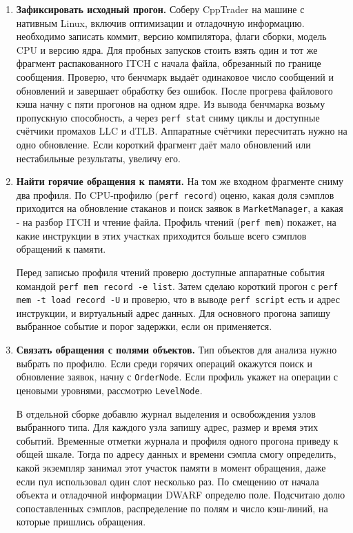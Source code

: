 \documentclass[a4paper,12pt]{article}
\begin{document}
\begin{enumerate}
    \item \textbf{Зафиксировать исходный прогон.}
    Соберу CppTrader на машине с нативным Linux, включив оптимизации
    и отладочную информацию. необходимо записать коммит, версию компилятора, флаги
    сборки, модель CPU и версию ядра.
    Для пробных запусков стоить взять один и тот же фрагмент распакованного ITCH
    с начала файла, обрезанный по границе сообщения. Проверю, что бенчмарк
    выдаёт одинаковое число сообщений и обновлений и завершает обработку
    без ошибок. После прогрева файлового кэша начну с пяти прогонов на одном
    ядре. Из вывода бенчмарка возьму пропускную способность, а через
    \texttt{perf stat} сниму циклы и доступные счётчики промахов LLC и dTLB.
    Аппаратные счётчики пересчитать нужно на одно обновление. Если короткий 
    фрагмент даёт мало обновлений
    или нестабильные результаты, увеличу его.

    \item \textbf{Найти горячие обращения к памяти.}
    На том же входном фрагменте сниму два профиля. По CPU-профилю
    (\texttt{perf record}) оценю, какая доля сэмплов приходится на обновление
    стаканов и поиск заявок в \texttt{MarketManager}, а какая - на разбор
    ITCH и чтение файла. Профиль чтений (\texttt{perf mem}) покажет, на какие
    инструкции в этих участках приходится больше всего сэмплов обращений
    к памяти.

    Перед записью профиля чтений проверю доступные
    аппаратные события командой \texttt{perf mem record -e list}. 
    Затем сделаю короткий прогон с
    \texttt{perf mem -t load record -U} и проверю, что в выводе
    \texttt{perf script} есть и адрес инструкции, и виртуальный адрес
    данных. Для основного прогона запишу выбранное событие и порог задержки,
    если он применяется.

    \item \textbf{Связать обращения с полями объектов.}
    Тип объектов для анализа нужно выбрать по профилю. Если среди горячих операций
    окажутся поиск и обновление заявок, начну с \texttt{OrderNode}. Если
    профиль укажет на операции с ценовыми уровнями, рассмотрю
    \texttt{LevelNode}.

    В отдельной сборке добавлю журнал выделения и освобождения узлов
    выбранного типа. Для каждого узла запишу адрес, размер и время этих
    событий. Временные отметки журнала и профиля одного прогона приведу
    к общей шкале. Тогда по адресу данных и времени сэмпла смогу определить,
    какой экземпляр занимал этот участок памяти в момент обращения, даже
    если пул использовал один слот несколько раз. По смещению от начала
    объекта и отладочной информации DWARF определю поле. Подсчитаю долю
    сопоставленных сэмплов, распределение по полям и число кэш-линий,
    на которые пришлись обращения.


\end{enumerate}
\end{document}
